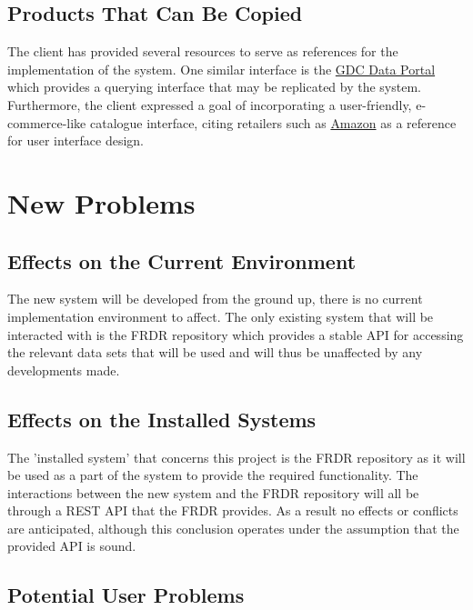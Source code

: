 \documentclass[12pt]{article}
\begin{document}
\subsection{Products That Can Be Copied}


The client has provided several resources to serve as references for the implementation of the system. One similar interface is the \href{https://portal.gdc.cancer.gov/analysis_page?app=CohortBuilder&tab=general_diagnosis}{GDC Data Portal} which provides a querying interface that may be replicated by the system. Furthermore, the client expressed a goal of incorporating a user-friendly, e-commerce-like catalogue interface, citing retailers such as \href{https://amazon.ca}{Amazon} as a reference for user interface design. 


\section{New Problems}
\subsection{Effects on the Current Environment}

The new system will be developed from the ground up, there is no current implementation environment to affect. The only existing system that will be interacted with is the FRDR repository which provides
a stable API for accessing the relevant data sets that will be used and will thus be unaffected by any developments made.

\subsection{Effects on the Installed Systems}

\par{ The 'installed system' that concerns this project is the FRDR repository as it will be used as a part of the system to provide the required functionality. The interactions between the new system and
the FRDR repository will all be through a REST API that the FRDR provides. As a result no effects or conflicts are anticipated, although this conclusion operates under the assumption that the provided
API is sound. }


\subsection{Potential User Problems}
\end{document}
